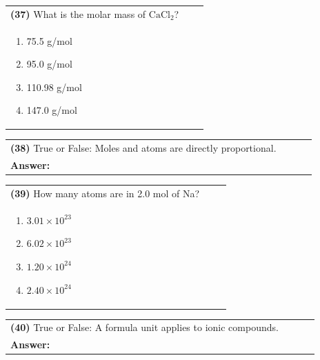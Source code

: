 \documentclass{article}
\begin{document}
\vspace{0.2cm}
\noindent \begin{tabular}{|p{0.9\linewidth}|}
\hline
\vspace{0.2cm}
\textbf{(37)} What is the molar mass of $\mathrm{CaCl_2}$?\\
\begin{minipage}[t]{0.85\linewidth}
\begin{enumerate}[label=\alph*.]
\item 75.5 g/mol
\item 95.0 g/mol
\item 110.98 g/mol
\item 147.0 g/mol
\end{enumerate}
\end{minipage}\\
\hline
\end{tabular}

\vspace{0.2cm}
\noindent \begin{tabular}{|p{0.9\linewidth}|}
\hline
\vspace{0.2cm}
\textbf{(38)} True or False: Moles and atoms are directly proportional.\\
\textbf{Answer:} \underline{\hspace{2cm}}\\
\hline
\end{tabular}

\vspace{0.2cm}
\noindent \begin{tabular}{|p{0.9\linewidth}|}
\hline
\vspace{0.2cm}
\textbf{(39)} How many atoms are in 2.0 mol of Na?\\
\begin{minipage}[t]{0.85\linewidth}
\begin{enumerate}[label=\alph*.]
\item $3.01\times10^{23}$
\item $6.02\times10^{23}$
\item $1.20\times10^{24}$
\item $2.40\times10^{24}$
\end{enumerate}
\end{minipage}\\
\hline
\end{tabular}

\vspace{0.2cm}
\noindent \begin{tabular}{|p{0.9\linewidth}|}
\hline
\vspace{0.2cm}
\textbf{(40)} True or False: A formula unit applies to ionic compounds.\\
\textbf{Answer:} \underline{\hspace{2cm}}\\
\hline
\end{tabular}
\newpage
\end{document}
